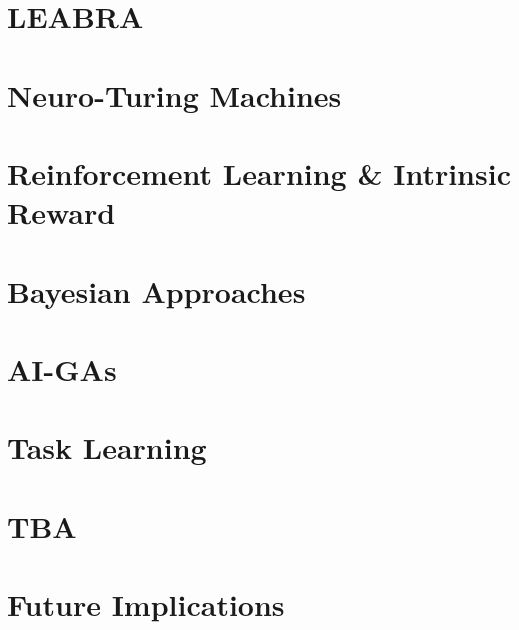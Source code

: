 \documentclass[11pt]{article}
\begin{document}
\section{LEABRA}


\section{Neuro-Turing Machines}


\section{Reinforcement Learning \& Intrinsic Reward}


\section{Bayesian Approaches}


\section{AI-GAs}


\section{Task Learning}


\section{TBA}


\section{Future Implications}


\newpage
\nocite{*}

\end{document}
